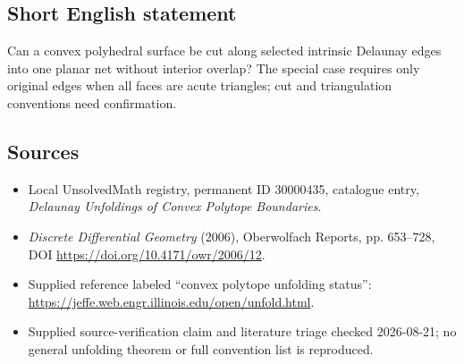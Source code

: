\documentclass[11pt]{article}
\begin{document}
\subsection{Short English statement}
Can a convex polyhedral surface be cut along selected intrinsic Delaunay edges into one planar net without interior overlap? The special case requires only original edges when all faces are acute triangles; cut and triangulation conventions need confirmation.
\subsection{Sources}
\begin{itemize}
\item Local UnsolvedMath registry, permanent ID 30000435, catalogue entry, \emph{Delaunay Unfoldings of Convex Polytope Boundaries}.
\item \emph{Discrete Differential Geometry} (2006), Oberwolfach Reports, pp. 653--728, DOI \url{https://doi.org/10.4171/owr/2006/12}.
\item Supplied reference labeled ``convex polytope unfolding status'': \url{https://jeffe.web.engr.illinois.edu/open/unfold.html}.
\item Supplied source-verification claim and literature triage checked 2026-08-21; no general unfolding theorem or full convention list is reproduced.
\end{itemize}
\end{document}
